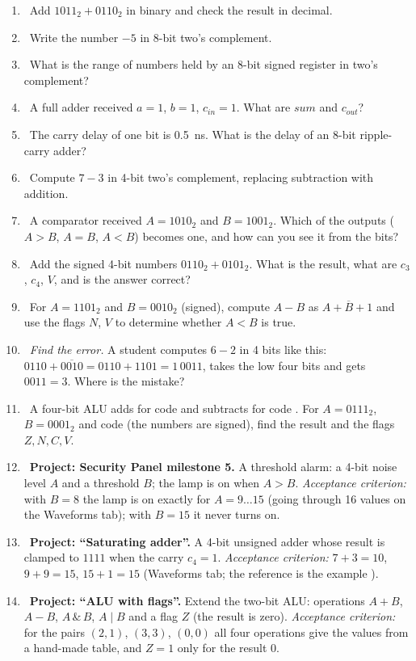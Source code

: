\begin{taskbox}
\begin{enumerate}
  \item {}~Add $1011_2 + 0110_2$ in binary and check the result in decimal.
  \item {}~Write the number $-5$ in 8-bit two's complement.
  \item {}~What is the range of numbers held by an 8-bit signed register in two's complement?
  \item {}~A full adder received $a=1$, $b=1$, $c_{in}=1$. What are $sum$ and $c_{out}$?
  \item {}~The carry delay of one bit is 0.5~ns. What is the delay of an 8-bit ripple-carry adder?
  \item {}~Compute $7 - 3$ in 4-bit two's complement, replacing subtraction with addition.
  \item {}~A comparator received $A=1010_2$ and $B=1001_2$. Which of the outputs ($A>B$, $A=B$, $A<B$) becomes one, and how can you see it from the bits?
  \item {}~Add the signed 4-bit numbers $0110_2+0101_2$. What is the result, what are $c_3$, $c_4$, $V$, and is the answer correct?
  \item {}~For $A=1101_2$ and $B=0010_2$ (signed), compute $A-B$ as $A+\overline{B}+1$ and use the flags $N$, $V$ to determine whether $A<B$ is true.
  \item {}~\emph{Find the error.} A student computes $6-2$ in 4 bits like this: $0110+\overline{0010}=0110+1101=1\,0011$, takes the low four bits and gets $0011=3$. Where is the mistake?
  \item {}~A four-bit ALU adds for code  and subtracts for code . For $A=0111_2$, $B=0001_2$ and code  (the numbers are signed), find the result and the flags $Z,N,C,V$.
  \item {}~\textbf{Project: Security Panel milestone 5.} A threshold alarm: a 4-bit noise level $A$ and a threshold $B$; the lamp is on when $A>B$. \emph{Acceptance criterion:} with $B=8$ the lamp is on exactly for $A=9\ldots 15$ (going through 16 values on the Waveforms tab); with $B=15$ it never turns on.
  \item {}~\textbf{Project: ``Saturating adder''.} A 4-bit unsigned adder whose result is clamped to $1111$ when the carry $c_4=1$. \emph{Acceptance criterion:} $7+3=10$, $9+9=15$, $15+1=15$ (Waveforms tab; the reference is the example ).
  \item {}~\textbf{Project: ``ALU with flags''.} Extend the two-bit ALU: operations $A+B$, $A-B$, $A\,\&\,B$, $A\mid B$ and a flag $Z$ (the result is zero). \emph{Acceptance criterion:} for the pairs $(2,1)$, $(3,3)$, $(0,0)$ all four operations give the values from a hand-made table, and $Z=1$ only for the result $0$.
\end{enumerate}
\end{taskbox}

